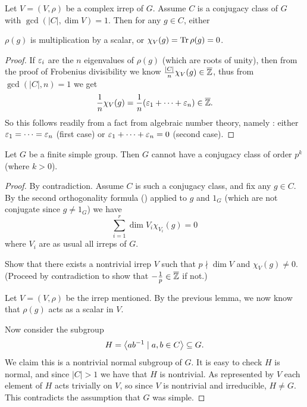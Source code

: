 \begin{lemma}[On $\gcd(|C|, \dim V) = 1$]
	\label{lem:burnside_ant_lemma}
	Let $V = (V, \rho)$ be a complex irrep of $G$.
	Assume $C$ is a conjugacy class of $G$ with $\gcd(|C|, \dim V) = 1$.
	Then for any $g \in C$, either
	\begin{itemize}
		\ii $\rho(g)$ is multiplication by a scalar, or
		\ii $\chi_V(g) = \operatorname{Tr} \rho(g) = 0$.
	\end{itemize}
\end{lemma}
\begin{proof}
	If $\varepsilon_i$ are the $n$ eigenvalues of $\rho(g)$ (which are roots of unity),
	then from the proof of Frobenius divisibility we know
	$\frac{|C|}{n} \chi_V(g) \in \overline{\mathbb Z}$,
	thus from $\gcd(|C|, n) = 1$ we get
	\[ \frac1n \chi_V(g) = \frac1n(\varepsilon_1 + \dots + \varepsilon_n) \in \overline{\mathbb Z}. \]
	So this follows readily from a fact from algebraic number theory,
	namely :
	either $\varepsilon_1 = \dots = \varepsilon_n$ (first case) or
	$\varepsilon_1 + \dots + \varepsilon_n = 0$ (second case).
\end{proof}

\begin{lemma}
	Let $G$ be a finite simple group.
	Then $G$ cannot have a conjugacy class of order $p^k$ (where $k > 0$).
\end{lemma}
\begin{proof}
	By contradiction.
	Assume $C$ is such a conjugacy class, and fix any $g \in C$.
	By the second orthogonality formula ()
	applied to $g$ and $1_G$ (which are not conjugate since $g \neq 1_G$) we have
	\[ \sum_{i=1}^r \dim V_i \chi_{V_i}(g) = 0 \]
	where $V_i$ are as usual all irreps of $G$.
	\begin{exercise}
		Show that there exists a nontrivial irrep $V$
		such that $p \nmid \dim V$ and $\chi_V(g) \neq 0$.
		(Proceed by contradiction to show that $-\frac1p \in \overline{\mathbb Z}$ if not.)
	\end{exercise}
	Let $V = (V, \rho)$ be the irrep mentioned.
	By the previous lemma, we now know that $\rho(g)$ acts as a scalar in $V$.

	Now consider the subgroup
	\[ H = \left< ab^{-1} \mid a,b \in C \right> \subseteq G. \]
	We claim this is a nontrivial normal subgroup of $G$.
	It is easy to check $H$ is normal,
	and since $|C| > 1$ we have that $H$ is nontrivial.
	As represented by $V$ each element of $H$ acts trivially on $V$,
	so since $V$ is nontrivial and irreducible, $H \neq G$.
	This contradicts the assumption that $G$ was simple.
\end{proof}

